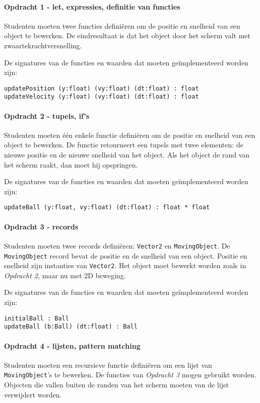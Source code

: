 		\paragraph{Opdracht 1 - let, expressies, definitie van functies}
			Studenten moeten twee functies definiëren om de positie en snelheid van een object te bewerken. De eindresultaat is dat het object door het scherm valt met zwaartekrachtversnelling.

            De signatures van de functies en waarden dat moeten geïmplementeerd worden zijn:
			\begin{lstlisting}
updatePosition (y:float) (vy:float) (dt:float) : float
updateVelocity (y:float) (vy:float) (dt:float) : float
			\end{lstlisting}


		\paragraph{Opdracht 2 - tupels, if's}
			Studenten moeten één enkele functie definiëren om de positie en snelheid van een object te bewerken. De functie retourneert een tupels met twee elementen: de nieuwe positie en de nieuwe snelheid van het object. Als het object de rand van het scherm raakt, dan moet hij opspringen.
			
            De signatures van de functies en waarden dat moeten geïmplementeerd worden zijn:
			\begin{lstlisting}
updateBall (y:float, vy:float) (dt:float) : float * float
			\end{lstlisting}


		\paragraph{Opdracht 3 - records}
			Studenten moeten twee records definiëren: \texttt{Vector2} en \texttt{MovingObject}. De \texttt{MovingObject} record bevat de positie en de snelheid van een object. Positie en snelheid zijn instanties van \texttt{Vector2}. Het object moet bewerkt worden zoals in \textit{Opdracht 2}, maar nu met 2D beweging.
			
            De signatures van de functies en waarden dat moeten geïmplementeerd worden zijn:
			\begin{lstlisting}
initialBall : Ball
updateBall (b:Ball) (dt:float) : Ball
			\end{lstlisting}


		\paragraph{Opdracht 4 - lijsten, pattern matching}
			Studenten moeten een recursieve functie definiëren om een lijst van \texttt{MovingObject}'s te bewerken. De functies van \textit{Opdracht 3} mogen gebruikt worden. Objecten die vallen buiten de randen van het scherm moeten van de lijst verwijdert worden.
			
